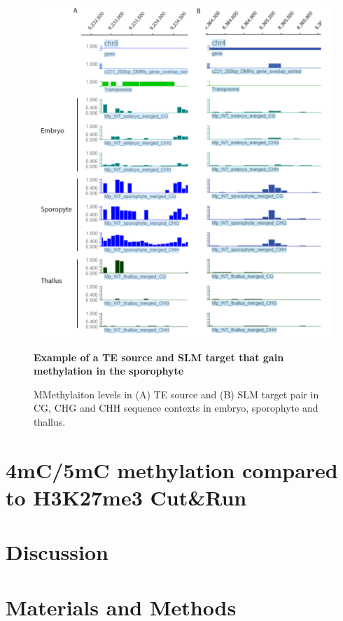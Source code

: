 \begin{figure}[htbp!] 
\centering    
    \includegraphics[width=1\textwidth]{Chapter3/Figs/Figure11_pairs_examples.pdf}
\caption{\textbf{Example of a TE  source and SLM target that gain methylation in the sporophyte}}
\label{fig:TE_SLM_pairs}
\captionsetup{font=small}
    \caption*{MMethylaiton levels in (A) TE source and (B) SLM target pair in CG, CHG and CHH sequence contexts in embryo, sporophyte and thallus.}
\end{figure}

\section{4mC/5mC methylation compared to H3K27me3 Cut\&Run}




\section{Discussion}

\section{Materials and Methods}

